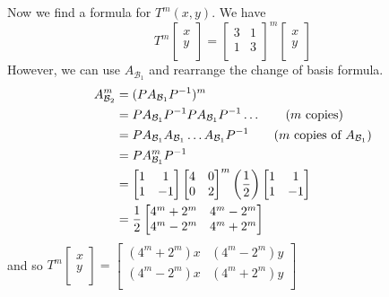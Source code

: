 \documentclass{article}
\begin{document}
\begin{example}
  Now we find a formula for $T^m(x, y)$. We have \[
    T^m
    \begin{bmatrix}
      x \\y\\
    \end{bmatrix} =
    \begin{bmatrix}
      3 & 1 \\
      1 & 3 \\
    \end{bmatrix}^m
    \begin{bmatrix}
      x \\y\\
    \end{bmatrix}
  \] However, we can use $A_{\mathcal{B}_1}$ and rearrange the change of basis formula.
  \begin{align*}
    A_{\mathcal{B}_2}^m & = (PA_{\mathcal{B}_1}P^{-1})^m                                                                             \\
                        & = PA_{\mathcal{B}_1}P^{-1}PA_{\mathcal{B}_1}P^{-1} \dots \tag{$m$ copies}                                  \\
                        & = PA_{\mathcal{B}_1}A_{\mathcal{B}_1}\dots A_{\mathcal{B}_1}P^{-1} \tag{$m$ copies of $A_{\mathcal{B}_1}$} \\
                        & = PA_{\mathcal{B}_1}^mP^{-1}                                                                               \\
                        & =
    \begin{bmatrix}
      1 & 1  \\
      1 & -1 \\
    \end{bmatrix}
    \begin{bmatrix}
      4 & 0 \\
      0 & 2 \\
    \end{bmatrix}^m \left(\frac{1}{2}\right)
    \begin{bmatrix}
      1 & 1  \\
      1 & -1 \\
    \end{bmatrix}                                                                                                                   \\
                        & = \frac{1}{2}
    \begin{bmatrix}
      4^m + 2^m & 4^m - 2^m \\
      4^m - 2^m & 4^m + 2^m \\
    \end{bmatrix}
  \end{align*} and so $T^m
    \begin{bmatrix}
      x \\y\\
    \end{bmatrix} =
    \begin{bmatrix}
      (4^m + 2^m)x & (4^m - 2^m)y \\
      (4^m - 2^m)x & (4^m + 2^m)y \\
    \end{bmatrix}$
\end{example}
\end{document}
